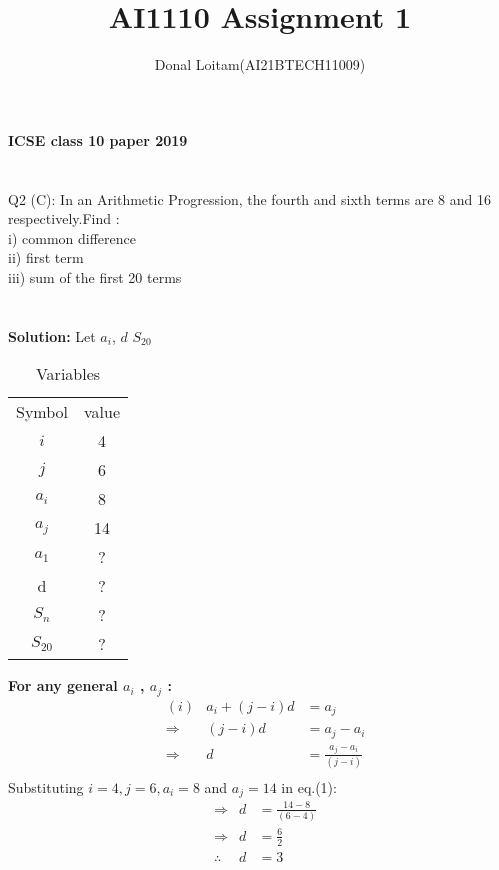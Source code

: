 \documentclass[journal, 12pt, twocolumn]{IEEEtran}
\title{AI1110 Assignment 1}
\author{Donal Loitam(AI21BTECH11009)}
\begin{document}
    \maketitle

    \textbf{\large{ICSE class 10 paper 2019}}\\
    \\
    \\
    {Q2 (C):
    In an Arithmetic Progression, the fourth and sixth terms are 8 and 16 respectively.Find :\\
 i) common difference\\
 ii) first term\\
 iii) sum of the first 20 terms}\\\\\\
    \textbf{\large{Solution:}}
    Let $a_i$, 
 \(d\) 
$S_{20}$\\

\begin{table}[h!]
\caption{Variables}
    \centering
    \begin{tabular}{|c|c|}
        \hline
        Symbol & value \\
        $ i $  &  4   \\
         $ j $  &  6   \\
         $ a_i $ &  8  \\
         $ a_j $ & 14  \\
         $ a_1 $ &  ?  \\
            d    &  ?  \\
        $S_{n}$  &  ?  \\
       $S_{20}$  &  ?  \\
          \hline
    \end{tabular}
\end{table}
    


\textbf{For any general $a_i$ , $a_j$ :}\\
\begin{align*}
        &(i)&a_i + (j-i)d &= a_j\\
        &\Rightarrow & (j-i)d &= a_j - a_i\\
        &\Rightarrow & d  &= \tfrac{a_j - a_i}{(j-i)} \tag{1}\\ 
    \end{align*}
Substituting  $i=4,j=6,a_i=8$ and $a_j=14$ in eq.(1):
\begin{align*}
 & \Rightarrow & d  &= \tfrac{14-8}{(6-4)} \\
    & \Rightarrow & d  &= \tfrac{6}{2} \\
        &  \therefore  & d  &=  3 \tag{2}  \\
\end{align*}
    
\end{document}
